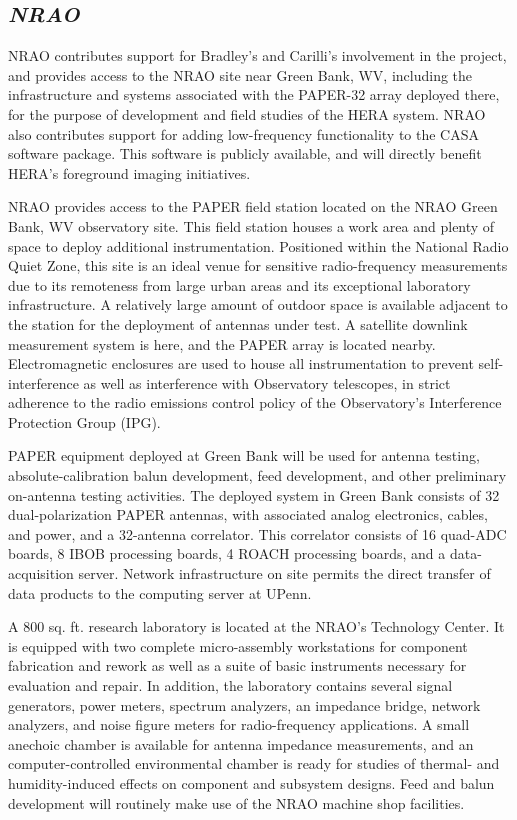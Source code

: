 \documentclass[11pt]{article}
\begin{document}
\subsection*{\it NRAO} 

NRAO contributes support for Bradley's and Carilli's involvement in the
project, and provides access to the NRAO site near Green Bank, WV,
including the infrastructure and systems associated with the PAPER-32
array deployed there, for the purpose of development and field studies
of the HERA system.  NRAO also contributes support for adding low-frequency
functionality to the CASA software package.  This software is publicly available,
and will directly benefit HERA's foreground imaging initiatives.

NRAO provides access to the PAPER field station located on the NRAO Green Bank, WV observatory
site. This field station houses a work area and plenty of space to deploy additional instrumentation.
Positioned within the National Radio Quiet Zone, this site is an ideal venue
for sensitive radio-frequency measurements due to its remoteness from
large urban areas and its exceptional laboratory infrastructure. A relatively
large amount of outdoor space is available adjacent to the station for the
deployment of antennas under test. A satellite downlink measurement system is
here, and the PAPER array is located nearby. Electromagnetic enclosures are
used to house all instrumentation to prevent self-interference as well as
interference with Observatory telescopes, in strict adherence to the radio
emissions control policy of the Observatory’s Interference Protection Group
(IPG).

PAPER equipment deployed at Green Bank will be used for antenna testing,
absolute-calibration balun development,
feed development, and other preliminary on-antenna testing activities.
The deployed system in Green Bank consists of 32 dual-polarization PAPER antennas,
with associated analog electronics, cables, and power, and a 32-antenna correlator.
This correlator consists of 16 quad-ADC boards, 8 IBOB processing boards,
4 ROACH processing boards, and a data-acquisition server.  Network infrastructure 
on site permits the direct transfer of data products to the computing server 
at UPenn.

A 800 sq. ft. research laboratory is located at the NRAO’s Technology Center.
It is equipped with two complete micro-assembly workstations for component
fabrication and rework as well as a suite of basic instruments necessary for
evaluation and repair. In addition, the laboratory contains several signal
generators, power meters, spectrum analyzers, an impedance bridge, network
analyzers, and noise figure meters for radio-frequency applications. A small
anechoic chamber is available for antenna impedance measurements, and an
computer-controlled environmental chamber is ready for studies of thermal- and
humidity-induced effects on component and subsystem designs. Feed and balun
development will routinely make
use of the NRAO machine shop facilities.
\end{document}

